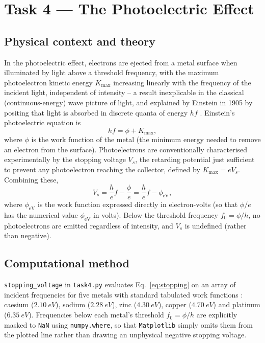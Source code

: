 \documentclass[11pt]{article}
\newcommand{\eV}{\text{eV}}
\begin{document}
\section{Task 4 --- The Photoelectric Effect}
\label{sec:task4}

\subsection{Physical context and theory}
In the photoelectric effect, electrons are ejected from a metal surface when illuminated by light above a threshold frequency, with the maximum photoelectron kinetic energy $K_\text{max}$ increasing linearly with the frequency of the incident light, independent of intensity -- a result inexplicable in the classical (continuous-energy) wave picture of light, and explained by Einstein in 1905 by positing that light is absorbed in discrete quanta of energy $hf$ \cite{einstein1905photoelectric}. Einstein's photoelectric equation is
\begin{equation}
hf = \phi + K_\text{max},
\end{equation}
where $\phi$ is the work function of the metal (the minimum energy needed to remove an electron from the surface). Photoelectrons are conventionally characterised experimentally by the stopping voltage $V_s$, the retarding potential just sufficient to prevent any photoelectron reaching the collector, defined by $K_\text{max}=eV_s$. Combining these,
\begin{equation}
\label{eq:stopping}
V_s = \frac{h}{e}f - \frac{\phi}{e} = \frac{h}{e}f - \phi_\eV,
\end{equation}
where $\phi_\eV$ is the work function expressed directly in electron-volts (so that $\phi/e$ has the numerical value $\phi_\eV$ in volts). Below the threshold frequency $f_0=\phi/h$, no photoelectrons are emitted regardless of intensity, and $V_s$ is undefined (rather than negative).

\subsection{Computational method}
\texttt{stopping\_voltage} in \texttt{task4.py} evaluates Eq.~\eqref{eq:stopping} on an array of incident frequencies for five metals with standard tabulated work functions \cite{hyperphysics}: caesium ($\SI{2.10}{eV}$), sodium ($\SI{2.28}{eV}$), zinc ($\SI{4.30}{eV}$), copper ($\SI{4.70}{eV}$) and platinum ($\SI{6.35}{eV}$). Frequencies below each metal's threshold $f_0=\phi/h$ are explicitly masked to \texttt{NaN} using \texttt{numpy.where}, so that \texttt{Matplotlib} simply omits them from the plotted line rather than drawing an unphysical negative stopping voltage.
\end{document}
